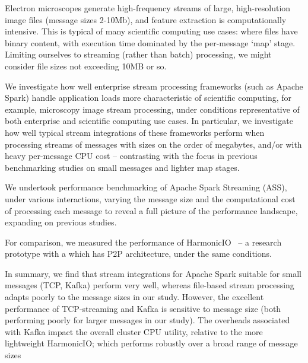 \documentclass[conference]{IEEEtran}
\begin{document}

Electron microscopes generate high-frequency streams of large, high-resolution image files (message sizes 2-10Mb), and feature extraction is computationally intensive. This is typical of many scientific computing use cases: where files have binary content, 
with execution time dominated by the per-message `map' stage.
Limiting ourselves to streaming (rather than batch) processing, we might consider file sizes not exceeding 10MB or so.%


We investigate how well enterprise stream processing frameworks (such as Apache Spark) handle application loads more characteristic of scientific computing, for example, microscopy image stream processing, under conditions representative of both enterprise and scientific computing use cases.
In particular, we investigate how well typical stream integrations of these frameworks perform when processing streams of messages with sizes on the order of megabytes, and/or with heavy per-message CPU cost -- contrasting with the focus in previous benchmarking studies on small messages and lighter map stages.

We undertook performance benchmarking of Apache Spark Streaming (ASS), under various interactions, varying the message size and the computational cost of processing each message to reveal a full picture of the performance landscape, expanding on previous studies.

For comparison, we measured the performance of HarmonicIO~\cite{torruangwatthanaHarmonicIOScalableData2018} -- a research prototype with a which has P2P architecture, under the same conditions. 

In summary, we find that stream integrations for Apache Spark suitable for small messages (TCP, Kafka) perform very well, whereas file-based stream processing adapts poorly to the message sizes in our study. However, the excellent performance of TCP-streaming and Kafka is sensitive to message size (both performing poorly for larger messages in our study). The overheads associated with Kafka impact the overall cluster CPU utility, relative to the more lightweight HarmonicIO; which performs robustly over a broad range of message sizes
\end{document}
